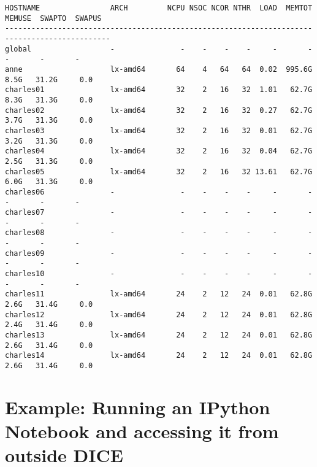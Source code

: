 \documentclass[]{article}
\begin{document}
\begin{verbatim}
HOSTNAME                ARCH         NCPU NSOC NCOR NTHR  LOAD  MEMTOT  MEMUSE  SWAPTO  SWAPUS
----------------------------------------------------------------------------------------------
global                  -               -    -    -    -     -       -       -       -       -
anne                    lx-amd64       64    4   64   64  0.02  995.6G    8.5G   31.2G     0.0
charles01               lx-amd64       32    2   16   32  1.01   62.7G    8.3G   31.3G     0.0
charles02               lx-amd64       32    2   16   32  0.27   62.7G    3.7G   31.3G     0.0
charles03               lx-amd64       32    2   16   32  0.01   62.7G    3.2G   31.3G     0.0
charles04               lx-amd64       32    2   16   32  0.04   62.7G    2.5G   31.3G     0.0
charles05               lx-amd64       32    2   16   32 13.61   62.7G    6.0G   31.3G     0.0
charles06               -               -    -    -    -     -       -       -       -       -
charles07               -               -    -    -    -     -       -       -       -       -
charles08               -               -    -    -    -     -       -       -       -       -
charles09               -               -    -    -    -     -       -       -       -       -
charles10               -               -    -    -    -     -       -       -       -       -
charles11               lx-amd64       24    2   12   24  0.01   62.8G    2.6G   31.4G     0.0
charles12               lx-amd64       24    2   12   24  0.01   62.8G    2.4G   31.4G     0.0
charles13               lx-amd64       24    2   12   24  0.01   62.8G    2.6G   31.4G     0.0
charles14               lx-amd64       24    2   12   24  0.01   62.8G    2.6G   31.4G     0.0
\end{verbatim}

\section{Example: Running an IPython Notebook and accessing it from
outside
DICE}\label{example-running-an-ipython-notebook-and-accessing-it-from-outside-dice}
\end{document}
